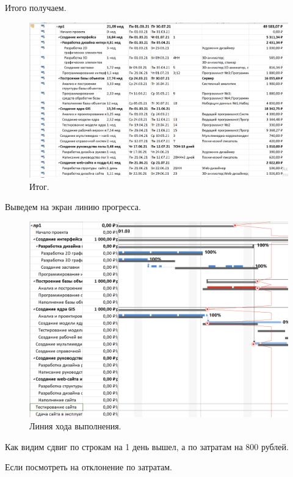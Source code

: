 \documentclass[a4paper,14pt]{extreport} %
\begin{document}
\begin{enumerate}
Итого получаем.

\begin{figure}[H]
  \centering
  \caption{Итог. }
  \includegraphics[scale=0.5]{18}
\end{figure}

Выведем на экран линию прогресса.

\begin{figure}[H]
  \centering
  \caption{Линия хода выполнения. }
  \includegraphics[scale=0.5]{19}
\end{figure}

Как видим сдвиг по строкам на 1 день вышел, а по затратам на 800 рублей.

Если посмотреть на отклонение по затратам.


\end{enumerate}
\end{document}
